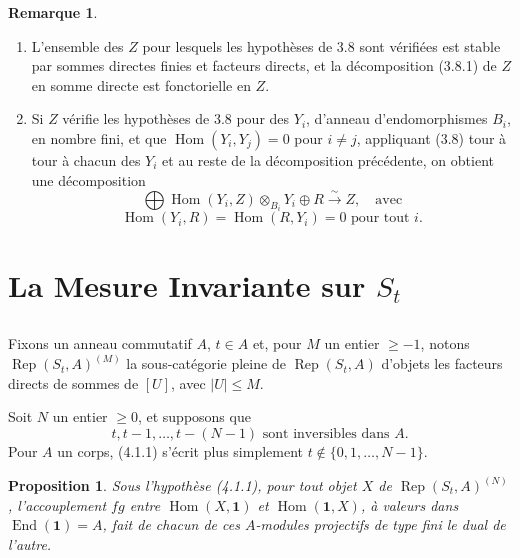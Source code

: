 \documentclass[11pt,a4paper]{article}
\theoremstyle{plain}
\newtheorem{proposition}[theorem]{Proposition}
\theoremstyle{definition}
\newtheorem{remark}[theorem]{Remarque}
\DeclareMathOperator{\Hom}{Hom}
\DeclareMathOperator{\End}{End}
\DeclareMathOperator{\Rep}{Rep}
\newcommand{\isom}{\xrightarrow{\sim}}
\begin{document}
\begin{remark}
\begin{enumerate}[label=(\roman*)]
\item L'ensemble des $Z$ pour lesquels les hypoth\`eses de 3.8 sont v\'erifi\'ees est stable par sommes directes finies et facteurs directs, et la d\'ecomposition (3.8.1) de $Z$ en somme directe est fonctorielle en $Z$.

\item Si $Z$ v\'erifie les hypoth\`eses de 3.8 pour des $Y_i$, d'anneau d'endomorphismes $B_i$, en nombre fini, et que $\Hom(Y_i, Y_j) = 0$ pour $i \neq j$, appliquant (3.8) tour \`a tour \`a chacun des $Y_i$ et au reste de la d\'ecomposition pr\'ec\'edente, on obtient une d\'ecomposition
\begin{equation}
\bigoplus \Hom(Y_i, Z) \otimes_{B_i} Y_i \oplus R \isom Z, \quad \text{avec} \tag{3.9.1}
\end{equation}
\begin{equation}
\Hom(Y_i, R) = \Hom(R, Y_i) = 0 \text{ pour tout } i. \tag{3.9.2}
\end{equation}
\end{enumerate}
\end{remark}


\section{La Mesure Invariante sur $S_t$}

\subsection{}
Fixons un anneau commutatif $A$, $t \in A$ et, pour $M$ un entier $\geq -1$, notons $\Rep(S_t, A)^{(M)}$ la sous-cat\'egorie pleine de $\Rep(S_t, A)$ d'objets les facteurs directs de sommes de $[U]$, avec $|U| \leq M$.

Soit $N$ un entier $\geq 0$, et supposons que
\begin{equation}
t, t-1, \ldots, t-(N-1) \text{ sont inversibles dans } A. \tag{4.1.1}
\end{equation}
Pour $A$ un corps, (4.1.1) s'\'ecrit plus simplement $t \notin \{0, 1, \ldots, N-1\}$.

\begin{proposition}
Sous l'hypoth\`ese (4.1.1), pour tout objet $X$ de $\Rep(S_t, A)^{(N)}$, l'accouplement $fg$ entre $\Hom(X, \mathbf{1})$ et $\Hom(\mathbf{1}, X)$, \`a valeurs dans $\End(\mathbf{1}) = A$, fait de chacun de ces $A$-modules projectifs de type fini le dual de l'autre.
\end{proposition}
\end{document}
